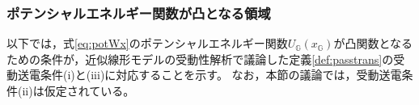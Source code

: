 \documentclass[tombow,dvipdfmx]{corona-a5-1.1}
\begin{document}
%
%

\smallskip
\subsubsection{ポテンシャルエネルギー関数が凸となる領域}

以下では，式\ref{eq:potWx}のポテンシャルエネルギー関数$U_{\mathds{G}}(x_{\mathds{G}})$が凸関数となるための条件が，近似線形モデルの受動性解析で議論した定義\ref{def:passtrans}の受動送電条件(i)と(iii)に対応することを示す。
なお，本節の議論では，受動送電条件(ii)は仮定されている。
\end{document}

